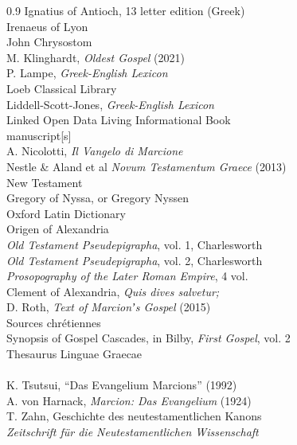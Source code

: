 \begin{spacing}{0.9}
Ignatius of Antioch, 13 letter edition (Greek) \\%
Irenaeus of Lyon \\%
John Chrysostom \\%
M. Klinghardt, \textit{Oldest Gospel} (2021) \\%
P. Lampe, \textit{Greek-English Lexicon} \\%
Loeb Classical Library \\%
Liddell-Scott-Jones, \textit{Greek-English Lexicon} \\%
Linked Open Data Living Informational Book \\%
manuscript[s] \\%
A. Nicolotti, \textit{Il Vangelo di Marcione} \\%
Nestle \& Aland et al \textit{Novum Testamentum Graece} (2013) \\%
New Testament \\%
Gregory of Nyssa, or Gregory Nyssen \\%
Oxford Latin Dictionary \\%
Origen of Alexandria \\%
\textit{Old Testament Pseudepigrapha}, vol. 1, Charlesworth\\%
\textit{Old Testament Pseudepigrapha}, vol. 2, Charlesworth\\%
\textit{Prosopography of the Later Roman Empire}, 4 vol.\\%
Clement of Alexandria, \textit{Quis dives salvetur;} \\%
D. Roth, \textit{Text of Marcionʼs Gospel} (2015) \\%
Sources chrétiennes \\%
Synopsis of Gospel Cascades, in Bilby, \textit{First Gospel}, vol. 2\\%
Thesaurus Linguae Graecae \\%
 \\%
K. Tsutsui, “Das Evangelium Marcions” (1992) \\%
A. von Harnack, \textit{Marcion: Das Evangelium} (1924) \\%
T. Zahn, Geschichte des neutestamentlichen Kanons \\%
\textit{Zeitschrift für die Neutestamentlichen Wissenschaft}
\end{spacing}

